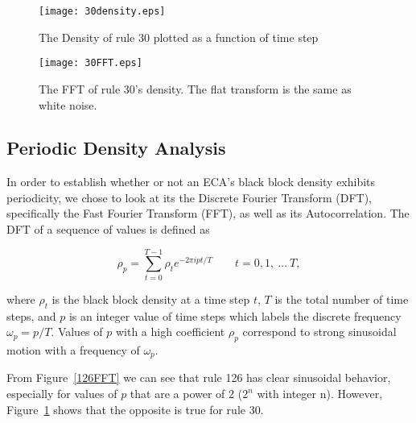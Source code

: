 \begin{figure}
    \begin{minipage}[b]{0.49\textwidth}
        \centering
        \texttt{[image: 30density.eps]}
        \caption{\label{30density} The Density of rule 30 plotted as a function of time step}
    \end{minipage}
    \hspace{0.5cm}
    \begin{minipage}[b]{0.49\textwidth}
        \centering
        \texttt{[image: 30FFT.eps]}
        \caption{\label{30FFT} The FFT of rule 30's density. The flat transform is the same as white noise.}
    \end{minipage}
\end{figure}


\subsection{Periodic Density Analysis}
In order to establish whether or not an ECA's black block density
exhibits periodicity, we chose to look at its the Discrete Fourier
Transform (DFT), specifically the Fast Fourier Transform (FFT), as
well as its Autocorrelation.
The DFT of a sequence of values is defined as

\begin{equation}
    \rho_p = \sum_{t=0}^{T-1} \rho_t e^{-2\pi i pt/T} \qquad t =
    0, 1,\ \ldots\ T,
\end{equation}

\noindent where $\rho_t$ is the black block density at a time step
$t$, $T$ is the total number of time steps, and $p$ is an integer
value of time steps which labels the discrete frequency
$\omega_p = p/T$.
Values of $p$ with a high coefficient $\rho_p$ correspond to strong
sinusoidal motion with a frequency of $\omega_p$.

From Figure~\ref{126FFT} we can see that rule 126 has clear sinusoidal
behavior, especially for values of $p$ that are a power of 2 ($2^n$
with integer n).
However, Figure~\ref{30FFT} shows that the opposite is true for rule
30.
